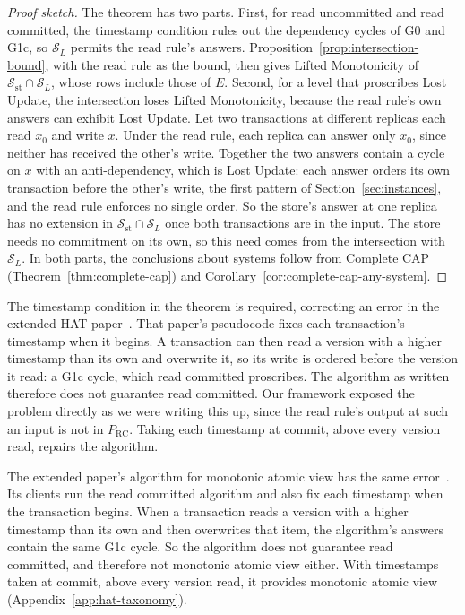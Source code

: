 \documentclass[sigconf]{cidr-2027}
\theoremstyle{remark}
\newcommand{\commitment}{commitment\xspace}
\newcommand{\Spec}{\mathcal{S}}
\begin{document}
\begin{proof}[Proof sketch]
The theorem has two parts. First, for read uncommitted and read committed,
the timestamp condition rules out the dependency cycles of G0 and G1c, so
$\Spec_L$ permits the read rule's answers. Proposition~\ref{prop:intersection-bound}, with the read rule as the bound,
then gives Lifted Monotonicity of $\Spec_{\mathrm{st}}\cap\Spec_L$, whose rows
include those of $E$. Second, for a level that proscribes Lost Update, the
intersection loses Lifted Monotonicity, because the read rule's own answers can
exhibit Lost Update. Let two transactions at different replicas each read
$x_0$ and write $x$. Under the read rule, each replica can answer only $x_0$,
since neither has received the other's write. Together the two answers contain
a cycle on $x$ with an anti-dependency, which is Lost Update: each answer
orders its own transaction before the other's write, the first pattern of
Section~\ref{sec:instances}, and the read rule enforces no single order. So
the store's
answer at one replica has no extension in $\Spec_{\mathrm{st}}\cap\Spec_L$ once
both transactions are in the input. The store needs no \commitment on its own,
so this need comes from the intersection with $\Spec_L$. In both parts, the
conclusions about systems follow from Complete CAP
(Theorem~\ref{thm:complete-cap}) and
Corollary~\ref{cor:complete-cap-any-system}.
\end{proof}

\textcolor{reviewed}{The timestamp condition in the theorem is required, correcting an error in the
extended HAT paper~\cite{bailis2013hatextended}.} \textcolor{reviewed}{That paper's pseudocode
fixes each transaction's timestamp when it begins.} \textcolor{reviewed}{A transaction can then read
a version with a higher timestamp than its own and overwrite it, so its write
is ordered before the version it read: a G1c cycle, which read committed
proscribes.} \textcolor{reviewed}{The algorithm as written therefore does not guarantee read
committed.} \textcolor{reviewed}{Our framework exposed the problem directly as we were writing this
up, since the read rule's output at such an input is not in $P_{\mathrm{RC}}$.} \textcolor{reviewed}{Taking each timestamp at commit, above every version read, repairs the
algorithm.}

The extended paper's algorithm for monotonic atomic view has the same
error~\cite[App.~B]{bailis2013hatextended}. Its clients run the read committed
algorithm and also fix each timestamp when the transaction begins. When a
transaction reads a version with a higher timestamp than its own and then
overwrites that item, the algorithm's answers contain the same G1c cycle. So
the algorithm does not guarantee read committed, and therefore not monotonic
atomic view either. With timestamps taken at commit, above every version
read, it provides monotonic atomic view (Appendix~\ref{app:hat-taxonomy}).
\end{document}
